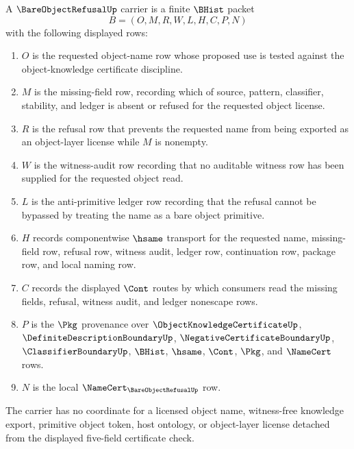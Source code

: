 \begin{definition}
\label{def:bare-object-refusal-carrier}
A $\BareObjectRefusalUp$ carrier is a finite $\BHist$ packet
$$
B=(O,M,R,W,L,H,C,P,N)
$$
with the following displayed rows:
\begin{enumerate}
\item $O$ is the requested object-name row whose proposed use is tested against the object-knowledge certificate discipline.
\item $M$ is the missing-field row, recording which of source, pattern, classifier, stability, and ledger is absent or refused for the requested object license.
\item $R$ is the refusal row that prevents the requested name from being exported as an object-layer license while $M$ is nonempty.
\item $W$ is the witness-audit row recording that no auditable witness row has been supplied for the requested object read.
\item $L$ is the anti-primitive ledger row recording that the refusal cannot be bypassed by treating the name as a bare object primitive.
\item $H$ records componentwise $\hsame$ transport for the requested name, missing-field row, refusal row, witness audit, ledger row, continuation row, package row, and local naming row.
\item $C$ records the displayed $\Cont$ routes by which consumers read the missing fields, refusal, witness audit, and ledger nonescape rows.
\item $P$ is the $\Pkg$ provenance over $\ObjectKnowledgeCertificateUp$, $\DefiniteDescriptionBoundaryUp$, $\NegativeCertificateBoundaryUp$, $\ClassifierBoundaryUp$, $\BHist$, $\hsame$, $\Cont$, $\Pkg$, and $\NameCert$ rows.
\item $N$ is the local $\NameCert_{\BareObjectRefusalUp}$ row.
\end{enumerate}
The carrier has no coordinate for a licensed object name, witness-free knowledge export, primitive object token, host ontology, or object-layer license detached from the displayed five-field certificate check.
\end{definition}

